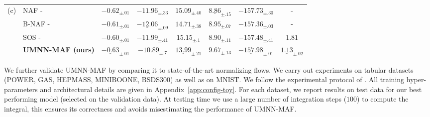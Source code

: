 \documentclass{article}
\newcommand{\mb}{\boldsymbol}
\newcommand{\tbf}[1]{\textbf{#1}}
\newcommand\mean[3]{\fp_to_decimal:n {round((#1 + #2 + #3)/3, 2)}}
\newcommand\std[3]{\fp_to_decimal:n {round(sqrt((#1^2 + #2^2 + #3^2)/3 - ((#1 + #2 + #3)/3)^2 ), 2)}}
\newcommand\meanstd[3]{$\mean{#1}{#2}{#3}_{\pm \std{#1}{#2}{#3}}$}
\begin{document}
\begin{table}
\begin{tabular}{l l c c c c c c }
        \multirow{3}{*}{(c)}
        & NAF - \cite{NAF}& $-0.62_{\pm.01}$ & $-11.96_{\pm.33}$ & $15.09_{\pm.40}$ & $\mb{\underline{8.86}}_{\pm.15}$ & $-157.73_{\pm.30}$ & - \\
        & B-NAF - \cite{BNAF}& $-0.61_{\pm.01}$ & $\underline{-12.06}_{\pm.09}$ & $14.71_{\pm.38}$ & $8.95_{\pm.07}$ & $-157.36_{\pm.03}$ & -  \\
        & SOS - \cite{sos}& $-0.60_{\pm .01}$ & $-11.99_{\pm .41}$ & $15.15_{\pm .1}$ & $8.90_{\pm .11}$ & $-157.48_{\pm .41}$ & $1.81$\\
        & \tbf{UMNN-MAF (ours)}
        & $\mb{\underline{-0.63}}_{\pm .01}$
        & $-10.89_{\pm .7}$
        & $\underline{13.99}_{\pm .21}$
        & $9.67_{\pm .13}$
        & $\underline{-157.98}_{\pm .01}$ %
        & $\mb{\underline{1.13}}_{\pm.02}$ %
        \\ \hline
    \end{tabular}

\end{table}

We further validate UMNN-MAF by comparing it to state-of-the-art normalizing flows.
We carry out experiments on tabular datasets (POWER, GAS, HEPMASS, MINIBOONE, BSDS300) as well as on MNIST. We follow the experimental protocol of \cite{MAF}.
All training hyper-parameters and architectural details are given in Appendix~\ref{app:config-toy}.
For each dataset, we report results on test data for our best performing model (selected on the validation data).
At testing time we use a large number of integration steps ($100$) to compute the integral, this ensures its correctness and avoids misestimating the performance of UMNN-MAF.

\end{document}
